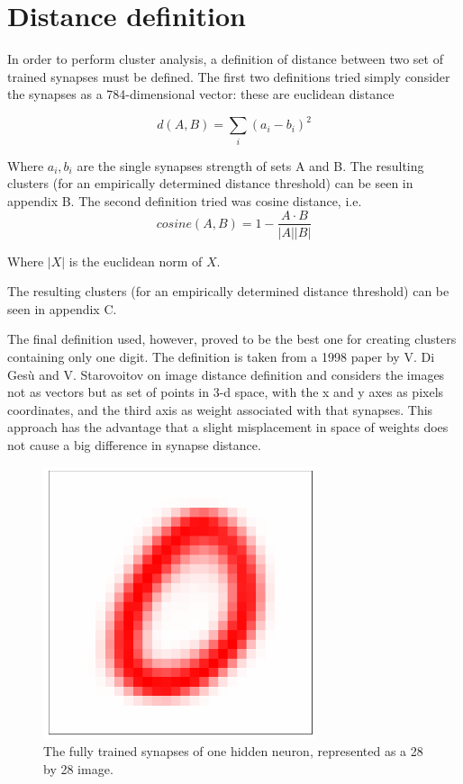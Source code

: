 \documentclass[a4paper]{report}
\begin{document}
\section{Distance definition}

In order to perform cluster analysis, a definition of distance between two set of trained synapses must be defined.
The first two definitions tried simply consider the synapses as a 784-dimensional vector:
these are euclidean distance

\begin{equation}
    d(A,B) = \sum_i (a_i-b_i)^2
\end{equation}

Where $a_i, b_i$ are the single synapses strength of sets A and B.
The resulting clusters (for an empirically determined distance threshold) can be seen in appendix B.
The second definition tried was cosine distance, i.e.
\begin{equation}
    cosine(A,B) = 1 - \frac{A \cdot B}{|A||B|}
\end{equation}

Where $|X|$ is the euclidean norm of $X$.

The resulting clusters (for an empirically determined distance threshold) can be seen in appendix C.

The final definition used, however, proved to be the best one for creating clusters containing only one digit.
The definition is taken from a 1998 paper by V. Di Gesù and V. Starovoitov on image distance definition and considers the images not as vectors but as set of points in 3-d space, with the x and y axes as pixels coordinates, and the third axis as weight associated with that synapses.
This approach has the advantage that a slight misplacement in space of weights does not cause a big difference in synapse distance.

\begin{figure} [H]
    \centering
    \includegraphics [width=8cm ] {o/zero.png}
    \caption{The fully trained synapses of one hidden neuron, represented as a 28 by 28 image.}
    \label{zero}
\end{figure}
\end{document}
